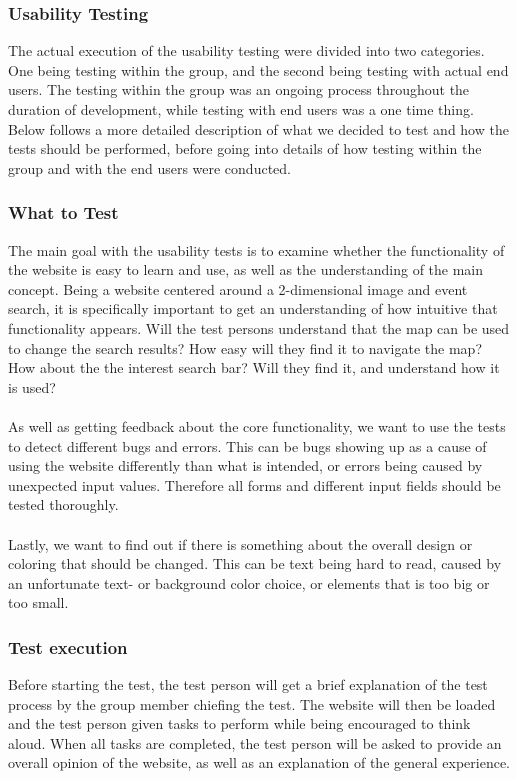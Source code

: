 \subsubsection{Usability Testing} The actual execution of the usability testing were divided into two categories. One being testing within the group, and the second being testing with actual end users. The testing within the group was an ongoing process throughout the duration of development, while testing with end users was a one time thing. Below follows a more detailed description of what we decided to test and how the tests should be performed, before going into details of how testing within the group and with the end users were conducted.

\subsubsection{What to Test} The main goal with the usability tests is to examine whether the functionality of the website is easy to learn and use, as well as the understanding of the main concept. Being a website centered around a 2-dimensional image and event search, it is specifically important to get an understanding of how intuitive that functionality appears. Will the test persons understand that the map can be used to change the search results? How easy will they find it to navigate the map? How about the the interest search bar? Will they find it, and understand how it is used?

\paragraph{} As well as getting feedback about the core functionality, we want to use the tests to detect different bugs and errors. This can be bugs showing up as a cause of using the website differently than what is intended, or errors being caused by unexpected input values. Therefore all forms and different input fields should be tested thoroughly.

\paragraph{} Lastly, we want to find out if there is something about the overall design or coloring that should be changed. This can be text being hard to read, caused by an unfortunate text- or background color choice, or elements that is too big or too small.  

\subsubsection{Test execution} Before starting the test, the test person will get a brief explanation of the test process by the group member chiefing the test. The website will then be loaded and the test person given tasks to perform while being encouraged to think aloud. When all tasks are completed, the test person will be asked to provide an overall opinion of the website, as well as an explanation of the general experience. 

